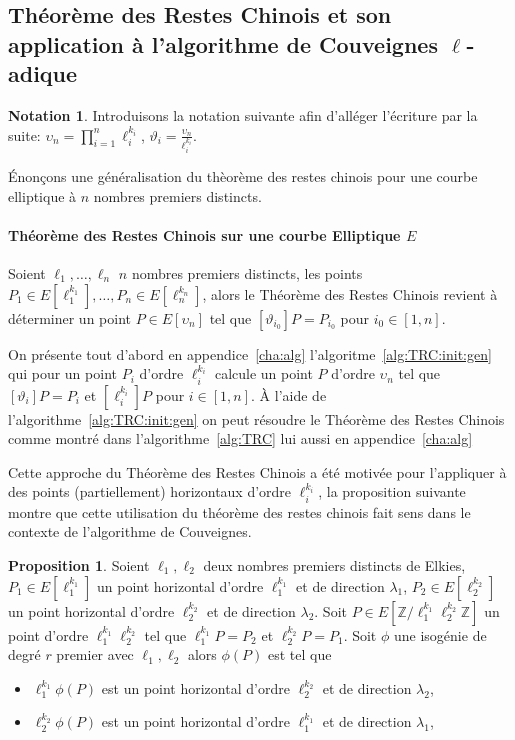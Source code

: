 \documentclass[10pt,a4paper]{book}
\theoremstyle{plain}
\theoremstyle{definition}
\theoremstyle{definition}
\theoremstyle{definition}
\newtheorem{prop}[thm]{Proposition}
\theoremstyle{definition}
\theoremstyle{remark}
\theoremstyle{remark}
\theoremstyle{definition}
\newtheorem{nota}[thm]{Notation}
\begin{document}
\subsection{Théorème des Restes Chinois et son application à l'algorithme de Couveignes $\ell$-adique}
\label{sub:TRCE:cou}


\begin{nota}
Introduisons la notation suivante afin d'alléger l'écriture par la suite: 
$\upsilon_n=\prod_{i=1}^n \ell_i^{k_i}$, 
$\vartheta_i=\frac{\upsilon_n}{\ell_i^{k_i}}$.
\end{nota}

\'Enonçons une généralisation du thèorème des restes chinois pour une courbe 
elliptique à $n$ nombres premiers distincts.

\paragraph{Théorème des Restes Chinois sur une courbe Elliptique $E$}
Soient $\ell_1, \dots, \ell_n$ $n$ nombres premiers distincts, les points $P_1 \in E[\ell_1^{k_1}], \dots, P_n \in E[\ell_n^{k_n}]$, alors le Théorème des Restes Chinois revient à déterminer un point $P \in E[\upsilon_n]$ tel que $[\vartheta_{i_0}] P=P_{i_0}$ pour $i_0 \in [1,n]$.

On présente tout d'abord en appendice~\ref{cha:alg} l'algoritme~\ref{alg:TRC:init:gen} qui 
pour un point $P_{i}$ d'ordre $\ell_{i}^{k_{i}}$ calcule un point $P$ d'ordre 
$\upsilon_n$ tel que $[\vartheta_{i}]P=P_{i}$ et $[\ell_{i}^{k_{i}}]P$ pour 
$i \in [1,n]$. \`A l'aide de l'algorithme~\ref{alg:TRC:init:gen} on peut résoudre le 
Théorème des Restes Chinois comme montré dans l'algorithme~\ref{alg:TRC} lui aussi en appendice~\ref{cha:alg}

Cette approche du Théorème des Restes Chinois a été motivée pour l'appliquer à 
des points (partiellement) horizontaux d'ordre $\ell_i^{k_i}$, la proposition 
suivante montre que cette utilisation du théorème des restes chinois fait sens 
dans le contexte de l'algorithme de Couveignes.

\begin{prop}
\label{pro:par:TRC}
Soient $\ell_1, \ell_2$ deux nombres premiers distincts de Elkies, 
$P_1 \in E[\ell_1^{k_1}]$ un point horizontal d'ordre 
$\ell_1^{k_1}$ et de direction $\lambda_1$, $P_2 \in E[\ell_2^{k_2}]$ un point 
horizontal d'ordre $\ell_2^{k_2}$ et de direction $\lambda_2$. Soit $P \in 
E[\mathbb{Z}/\ell_1^{k_1}\ell_2^{k_2}\mathbb{Z}]$ un point d'ordre 
$\ell_1^{k_1}\ell_2^{k_2}$ tel que $\ell_1^{k_1}P=P_2$ et $\ell_2^{k_2}P=P_1$.
Soit $\phi$ une isogénie de degré $r$ premier avec $\ell_1, \ell_2$ alors 
$\phi(P)$ est tel que
\begin{itemize}
\item $\ell_1^{k_1}\phi(P)$ est un point horizontal d'ordre 
$\ell_2^{k_2}$ et de direction $\lambda_2$,  
\item $\ell_2^{k_2}\phi(P)$ est un point horizontal d'ordre 
$\ell_1^{k_1}$ et de direction $\lambda_1$,
\end{itemize}
\end{prop}
\end{document}
